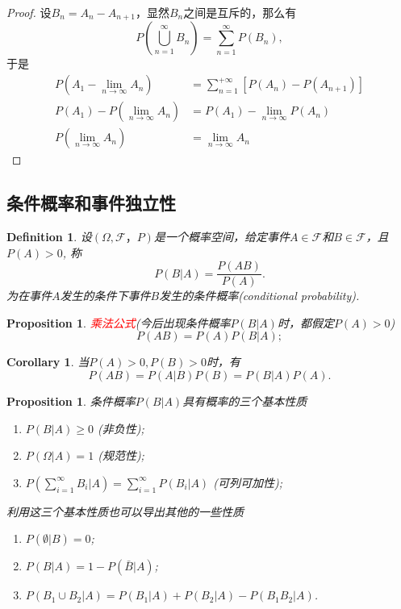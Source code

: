 \documentclass{article}
\newtheorem{corollary}[theorem]{Corollary}
\newtheorem{proposition}[theorem]{Proposition}
\newtheorem{definition}[theorem]{Definition}
\newcommand{\redt}[1]{\textcolor{red}{#1}}
\begin{document}
\begin{proof}
设$B_n = A_n - A_{n+1}$，显然$B_n$之间是互斥的，那么有
$$
P(\bigcup\limits_{n=1}^\infty B_n) = \sum\limits_{n=1}^{\infty} P(B_n),
$$
于是
$$
\begin{array}{rl}
P(A_1-\lim\limits_{n \to \infty} A_n) &=  \sum\limits_{n=1}^{+\infty} \left[P(A_n)-P(A_{n+1})\right] \\
P(A_1)- P(\lim\limits_{n \to \infty} A_n) &= P(A_1) - \lim\limits_{n \to \infty} P(A_n) \\
P(\lim\limits_{n \to \infty} A_n) &= \lim\limits_{n \to \infty} A_n
\end{array}
$$
\end{proof}


\newpage
\subsection{条件概率和事件独立性}

\begin{definition}
\rm 设$(\Omega,\mathscr{F}，P)$是一个概率空间，给定事件$A \in \mathscr{F}$和$B \in \mathscr{F}$，且$P(A) > 0$, 称
$$
P(B|A) = \frac{P(AB)}{P(A)}.
$$
为在事件$A$发生的条件下事件$B$发生的{\color{red}条件概率}(conditional probability).
\end{definition}

\begin{proposition}
\rm \redt{乘法公式}(今后出现条件概率$P(B|A)$时，都假定$P(A) > 0$)
$$
P(AB) = P(A)P(B|A);
$$
\end{proposition}

\begin{corollary}
\rm 当$P(A) > 0,P(B) > 0$时，有
$$
P(AB) = P(A|B)P(B) = P(B|A)P(A).
$$
\end{corollary}

\begin{proposition}
\rm 条件概率$P(B|A)$具有概率的三个基本性质
\begin{enumerate}
	\item $P(B|A) \geq 0$ (非负性);
	\item $P(\Omega|A) = 1$ (规范性);
	\item $P(\sum\limits_{i=1}^{\infty} B_i | A) = \sum\limits_{i=1}^{\infty}P(B_i | A)$ (可列可加性); 
\end{enumerate}

利用这三个基本性质也可以导出其他的一些性质
\begin{enumerate}
	\item $P(\emptyset | B) = 0$;
	\item $P(B|A) = 1 - P(\bar{B} | A)$;
	\item $P(B_1 \cup B_2 | A) = P(B_1 | A) + P(B_2 | A) - P(B_1B_2 |A)$. 
\end{enumerate}
\end{proposition}
\end{document}
